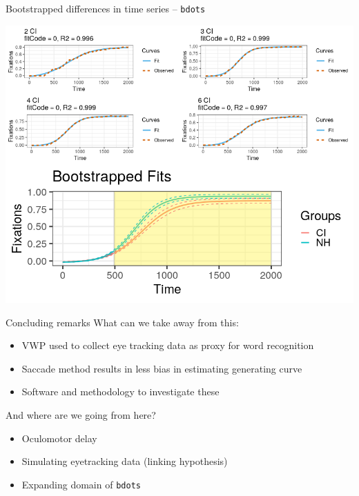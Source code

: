 \documentclass{beamer}
\begin{document}
\begin{frame}{Bootstrapped differences in time series -- \texttt{bdots}}
\vspace{-1mm}
\begin{center}
\includegraphics[scale=0.47]{img/bdots_plots.png}
\end{center}
\end{frame}


\begin{frame}{Concluding remarks}
What can we take away from this:
\begin{itemize}
\item VWP used to collect eye tracking data as proxy for word recognition
\item  Saccade method results in less bias in estimating generating curve
\item Software and methodology to investigate these
\end{itemize}
And where are we going from here?
\begin{itemize}
\item Oculomotor delay
\item Simulating eyetracking data (linking hypothesis)
\item Expanding domain of \texttt{bdots}
\end{itemize}
\end{frame}

\end{document}
